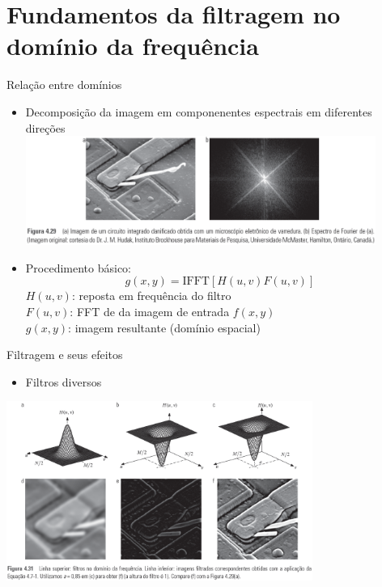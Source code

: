    \section[slide=true]{Fundamentos da filtragem no domínio da frequência}
      \begin{slide}[toc=]{Relação entre domínios}
         \begin{itemize}[type=1]
            \item Decomposição da imagem em componenentes espectrais em diferentes direções
            \includegraphics[width=0.9\textwidth]{figs/fig0429}
            \item Procedimento básico:
            \begin{equation*}
               g(x,y) = \text{IFFT}[H(u,v)F(u,v)]
            \end{equation*}
            $H(u,v)$: reposta em frequência do filtro\\
            $F(u,v)$: FFT de da imagem de entrada $f(x,y)$\\
            $g(x,y)$: imagem resultante (domínio espacial)
         \end{itemize}
      \end{slide}
      
      \begin{slide}[toc=]{Filtragem e seus efeitos}
         \begin{itemize}[type=1]
            \item Filtros diversos
         \end{itemize}
	      \begin{center}
            \includegraphics[width=0.75\textwidth]{figs/fig0431}
	      \end{center}
      \end{slide}
      
